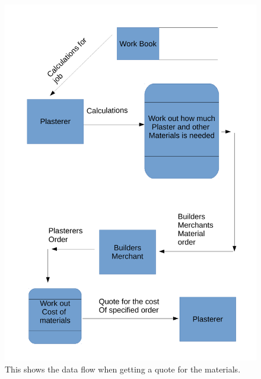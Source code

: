 \begin{figure}[H]
    \includegraphics[width=\textwidth]{./Analysis/images/GettingQuoteFromBuildersMerchant.pdf}
    \caption{This shows the data flow when getting a quote for the materials.} \label{fig:getting_materials_data_flow_diagram}
\end{figure}



